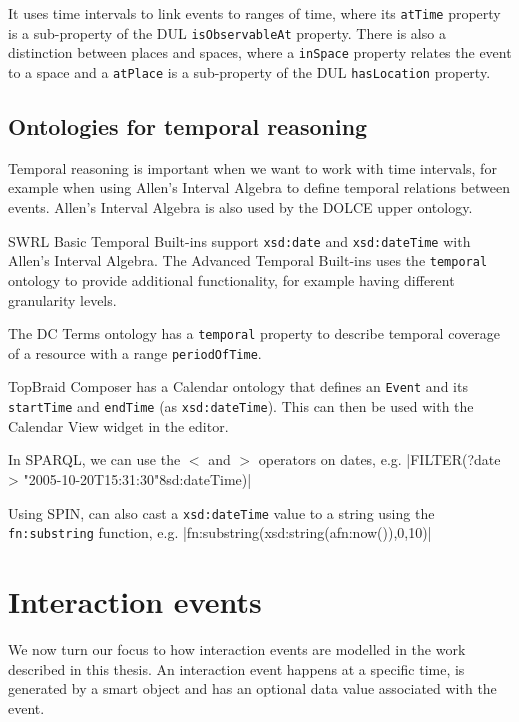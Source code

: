 It uses time intervals to link events to ranges of time, where its \texttt{atTime} property is a sub-property of the \ac{DUL} \texttt{isObservableAt} property. There is also a distinction between places and spaces, where a \texttt{inSpace} property relates the event to a space and a \texttt{atPlace} is a sub-property of the \ac{DUL} \texttt{hasLocation} property.


\subsection{Ontologies for temporal reasoning}
\label{TemporalReasoning}

Temporal reasoning is important when we want to work with time intervals, for example when using Allen's Interval Algebra to define temporal relations between events. Allen's Interval Algebra is also used by the \ac{DOLCE} \cite{Scherp2011} upper ontology. 

\ac{SWRL} Basic Temporal Built-ins support \texttt{xsd:date} and \texttt{xsd:dateTime} with Allen's Interval Algebra. The Advanced Temporal Built-ins uses the \texttt{temporal} ontology \cite{OConnor2010} to provide additional functionality, for example having different granularity levels.


The \ac{DC} Terms ontology has a \texttt{temporal} property to describe temporal coverage of a resource with a range \texttt{periodOfTime}.

TopBraid Composer has a Calendar ontology that defines an \texttt{Event} and its \texttt{startTime} and \texttt{endTime} (as \texttt{xsd:dateTime}). This can then be used with the Calendar View widget in the editor. 

In \ac{SPARQL}, we can use the $<$ and $>$ operators on dates, e.g. |FILTER(?date > "2005-10-20T15:31:30"^^xsd:dateTime)|

Using \ac{SPIN}, can also cast a \texttt{xsd:dateTime} value to a string using the \texttt{fn:substring} function, e.g. |fn:substring(xsd:string(afn:now()),0,10)|



\section{Interaction events}
We now turn our focus to how interaction events are modelled in the work described in this thesis. An interaction event happens at a specific time, is generated by a smart object and has an optional data value associated with the event.


